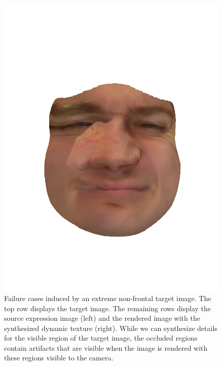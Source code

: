 \documentclass[10pt,twocolumn,letterpaper]{article}
\begin{document}
\begin{figure}[th]
\begin{center}
  \includegraphics[width=0.32\columnwidth]{figures/haokyle_transfer/dynamic_000681.png}
\end{center}
   \caption{Failure cases induced by an extreme non-frontal target image. The top row displays the target image. The remaining rows display the source expression image (left) and the rendered image with the synthesized dynamic texture (right). While we can synthesize details for the visible region of the target image, the occluded regions contain artifacts that are visible when the image is rendered with these regions visible to the camera.}
   \vspace{-0.05in}
\label{fig:replaceres2}
\end{figure}
\end{document}
